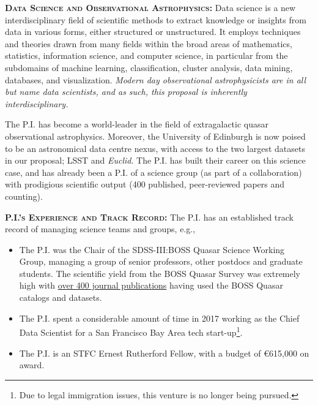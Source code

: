 \documentclass[oneside, a4paper, onecolumn, 11pt]{article}
\begin{document}
\smallskip
\smallskip
\noindent
\textbf{\textsc{{Data Science and Observational Astrophysics:}}}
Data science is a new interdisciplinary field of scientific methods to
extract knowledge or insights from data in various forms, either
structured or unstructured. It employs techniques and theories drawn
from many fields within the broad areas of mathematics, statistics,
information science, and computer science, in particular from the
subdomains of machine learning, classification, cluster analysis, data
mining, databases, and visualization.  {\it Modern day observational
astrophysicists are in all but name data scientists, and as such, this
proposal is inherently interdisciplinary.}



\smallskip
\smallskip
\noindent
The P.I. has become a world-leader in the field of extragalactic
quasar observational astrophysics.  Moreover, the University of
Edinburgh is now poised to be an astronomical data centre nexus, with
access to the two largest datasets in our proposal; LSST and {\it
Euclid}.  The P.I. has built their career on this science case, and
has already been a P.I.  of a science group (as part of a
collaboration) with prodigious scientific output (400 published,
peer-reviewed papers and counting).

\smallskip
\smallskip
\noindent
\textbf{\textsc{P.I.'s Experience and Track Record:}}
The P.I. has an established track record of managing science teams and groups, e.g., 

\begin{itemize}
\item The P.I. was the Chair
of the SDSS-III:BOSS Quasar Science Working Group, managing a
group of senior professors, other postdocs and graduate students.
The scientific yield from the BOSS Quasar Survey was extremely high 
with \href{https://tinyurl.com/ycxd8lb6}{over 400 journal publications} having 
used the BOSS Quasar catalogs and datasets.

\item The P.I. spent a considerable amount of time in 2017 working as the
Chief Data Scientist for a San Francisco Bay Area 
tech start-up\footnote{Due to legal immigration issues, this venture is no longer being pursued.}. 

\item The P.I. is an STFC Ernest Rutherford Fellow, with a budget of \euro615,000 on award. 
\end{itemize}
\end{document}
